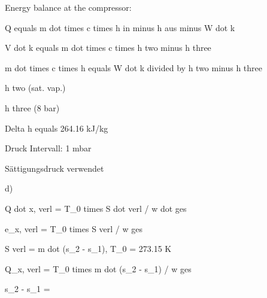 Energy balance at the compressor:

Q equals m dot times c times h in minus h aus minus W dot k

V dot k equals m dot times c times h two minus h three

m dot times c times h equals W dot k divided by h two minus h three

h two (sat. vap.)

h three (8 bar)

Delta h equals 264.16 kJ/kg

Druck Intervall: 1 mbar

Sättigungsdruck verwendet

d)

Q dot x, verl = T_0 times S dot verl / w dot ges

e_x, verl = T_0 times S verl / w ges

S verl = m dot (s_2 - s_1), T_0 = 273.15 K

Q_x, verl = T_0 times m dot (s_2 - s_1) / w ges

s_2 - s_1 =